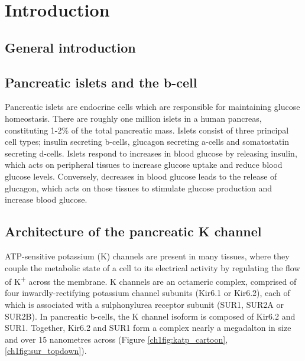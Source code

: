 \chapter{\label{ch:1-intro}Introduction} 

\graphicspath{{figures/ch1/}}

\minitoc

\section{General introduction}

\section{Pancreatic islets and the \textgreek{b}-cell}

Pancreatic islets are endocrine cells which are responsible for maintaining glucose homeostasis.
There are roughly one million islets in a human pancreas, constituting 1-2\% of the total pancreatic mass.
Islets consist of three principal cell types; insulin secreting \textgreek{b}-cells, glucagon secreting \textgreek{a}-cells and somatostatin secreting \textgreek{d}-cells.
Islets respond to increases in blood glucose by releasing insulin, which acts on peripheral tissues to increase glucose uptake and reduce blood glucose levels.
Conversely, decreases in blood glucose leads to the release of glucagon, which acts on those tissues to stimulate glucose production and increase blood glucose.

\section{Architecture of the pancreatic K\ATP{} channel}

ATP-sensitive potassium (K\ATP{}) channels are present in many tissues, where they couple the metabolic state of a cell to its electrical activity by regulating the flow of K\textsuperscript{+} across the membrane.
K\ATP{} channels are an octameric complex, comprised of four inwardly-rectifying potassium channel subunits (Kir6.1 or Kir6.2), each of which is associated with a sulphonylurea receptor subunit (SUR1, SUR2A or SUR2B).
In pancreatic \textgreek{b}-cells, the K\ATP{} channel isoform is composed of Kir6.2 and SUR1.
Together, Kir6.2 and SUR1 form a complex nearly a megadalton in size and over 15 nanometres across (Figure \ref{ch1fig:katp_cartoon}, \ref{ch1fig:sur_topdown}).

